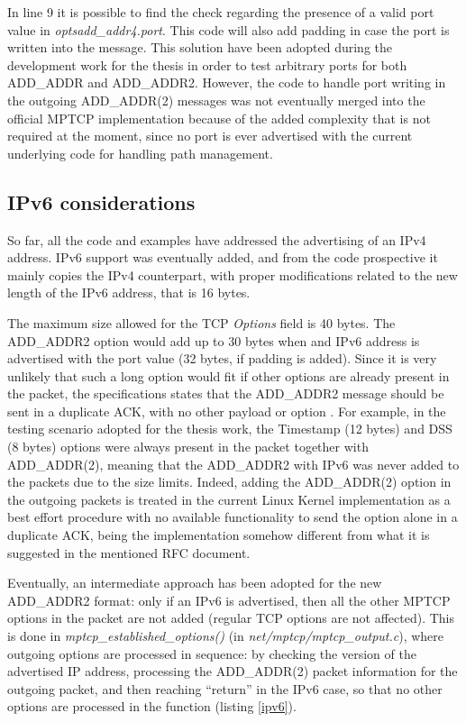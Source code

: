 In line 9 it is possible to find the check regarding the presence of a valid port value in \textit{opts\textrightarrow add\_addr4.port}. This code will also add padding in case the port is written into the message. This solution have been adopted during the development work for the thesis in order to test arbitrary ports for both ADD\_ADDR and ADD\_ADDR2. However, the code to handle port writing in the outgoing ADD\_ADDR(2) messages was not eventually merged into the official MPTCP implementation because of the added complexity that is not required at the moment, since no port is ever advertised with the current underlying code for handling path management.

\subsection{IPv6 considerations}
So far, all the code and examples have addressed the advertising of an IPv4 address. IPv6 support was eventually added, and from the code prospective it mainly copies the IPv4 counterpart, with proper modifications related to the new length of the IPv6 address, that is 16 bytes.

The maximum size allowed for the TCP \textit{Options} field is 40 bytes. The ADD\_ADDR2 option would add up to 30 bytes when and IPv6 address is advertised with the port value (32 bytes, if padding is added). Since it is very unlikely that such a long option would fit if other options are already present in the packet, the specifications states that the ADD\_ADDR2 message should be sent in a duplicate ACK, with no other payload or option \cite{rfc6824bis05}.
For example, in the testing scenario adopted for the thesis work, the Timestamp (12 bytes) and DSS (8 bytes) options were always present in the packet together with ADD\_ADDR(2), meaning that the ADD\_ADDR2 with IPv6 was never added to the packets due to the size limits. Indeed, adding the ADD\_ADDR(2) option in the outgoing packets is treated in the current Linux Kernel implementation as a best effort procedure with no available functionality to send the option alone in a duplicate ACK, being the implementation somehow different from what it is suggested in the mentioned RFC document.

Eventually, an intermediate approach has been adopted for the new ADD\_ADDR2 format: only if an IPv6 is advertised, then all the other MPTCP options in the packet are not added (regular TCP options are not affected). This is done in \textit{mptcp\_established\_options()} (in \textit{ net/mptcp/mptcp\_output.c}), where outgoing options are processed in sequence: by checking the version of the advertised IP address, processing the ADD\_ADDR(2) packet information for the outgoing packet, and then reaching ``return'' in the IPv6 case, so that no other options are processed in the function (listing \ref{ipv6}).

